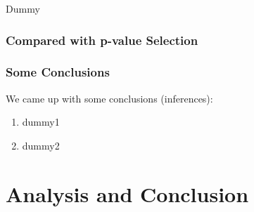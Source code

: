 \documentclass{beamer}
\begin{document}
\begin{frame}
Dummy
\frametitle{Compared with p-value Selection}
\end{frame}

\begin{frame}
\frametitle{Some Conclusions}
We came up with some conclusions (inferences):
\begin{enumerate}[<+(1)->]
	\item dummy1
	\item dummy2
\end{enumerate}
\end{frame}


\section{Analysis and Conclusion}
\end{document}

